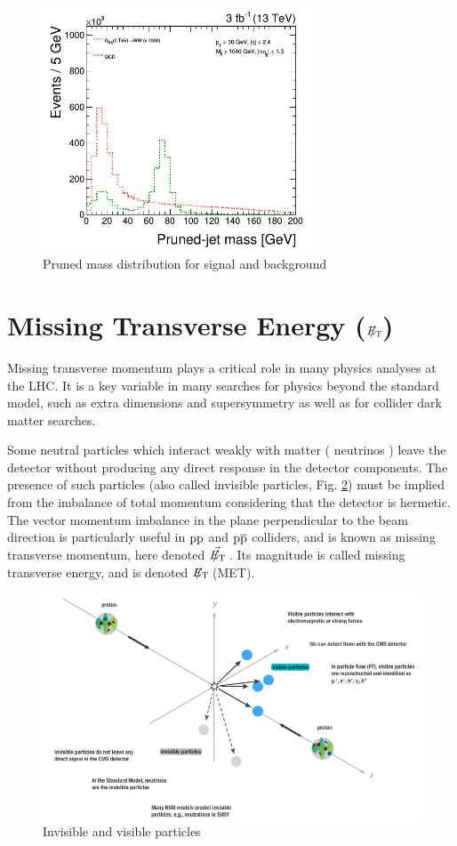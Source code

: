 \begin{figure}[H]
  \centering
\includegraphics[width=8cm]{physics_objects_plots/prun}
\caption{Pruned mass distribution for signal and background \label{jetprunfigure}}
\end{figure}


\section{Missing Transverse Energy ($E_{\mathrm{T}}\hspace{-1.1em}/\kern0.45em$) }\label{MET1}

Missing transverse momentum plays a critical role in many physics analyses at the LHC. It is a key variable in many searches for physics beyond the standard model, such as extra dimensions and supersymmetry as well as for collider dark matter searches.

Some neutral particles which interact weakly with matter ( \ie   neutrinos ) leave the detector without producing any direct response in the detector components. The presence of such particles (also called invisible particles, Fig. \ref{figuremet1}) must be implied from the imbalance of total momentum considering that the detector is hermetic. The vector momentum imbalance in the plane perpendicular to the beam direction is particularly useful in $\mathrm{p}\mathrm{p}$ and $\mathrm{p}\overline{\mathrm{p}}$ colliders, and is known as missing transverse momentum, here denoted $\vec{E_{\mathrm{T}}\hspace{-1.1em}/\kern0.45em}$ . Its magnitude is called missing transverse energy, and is denoted $E_{\mathrm{T}}\hspace{-1.1em}/\kern0.45em$ (MET).


\begin{figure}[H]
  \centering
\includegraphics[width=14cm]{physics_objects_plots/met_rec}
\caption{Invisible and visible particles \label{figuremet1}}
\end{figure}

